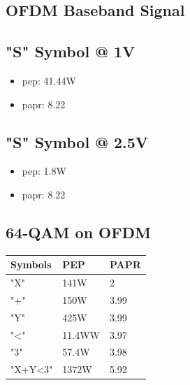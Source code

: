 \documentclass[a4paper]{article}
\begin{document}
\subsection{OFDM Baseband Signal}
\subsection*{"S" Symbol @ 1V}
\begin{itemize}
    \item \gls{pep}: 41.44W
    \item \gls{papr}: 8.22
\end{itemize}

\subsection*{"S" Symbol @ 2.5V}
\begin{itemize}
    \item \gls{pep}: 1.8W
    \item \gls{papr}: 8.22
\end{itemize}

\subsection{64-QAM on OFDM}
\begin{tabular}{|l|l|l|}
\hline
\textbf{Symbols} & \textbf{PEP} & \textbf{PAPR} \\ \hline
"X" & 141W & 2 \\ \hline
"+" & 150W & 3.99 \\ \hline
"Y" & 425W & 3.99 \\ \hline
"<" & 11.4WW & 3.97 \\ \hline
"3" & 57.4W & 3.98 \\ \hline
"X+Y<3" & 1372W & 5.92 \\ \hline
\end{tabular}
\end{document}

